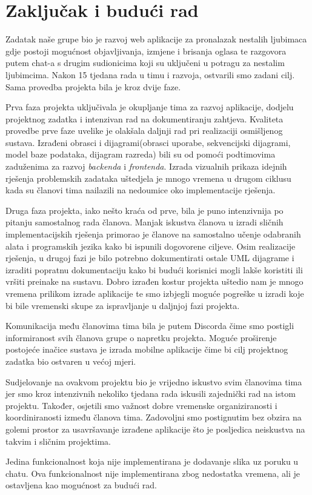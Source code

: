 \chapter{Zaključak i budući rad}

Zadatak naše grupe bio je razvoj web aplikacije za pronalazak nestalih ljubimaca gdje postoji mogućnost objavljivanja, izmjene i brisanja oglasa te razgovora putem chat-a s drugim sudionicima koji su uključeni u potragu za nestalim ljubimcima. Nakon 15 tjedana rada u timu i razvoja, ostvarili smo zadani cilj. Sama provedba projekta bila je kroz dvije faze.

Prva faza projekta uključivala je okupljanje tima za razvoj aplikacije, dodjelu projektnog zadatka i intenzivan rad na dokumentiranju zahtjeva. Kvaliteta provedbe prve faze uvelike je olakšala daljnji rad pri realizaciji osmišljenog sustava. Izrađeni obrasci i dijagrami(obrasci uporabe, sekvencijski dijagrami, model baze podataka, dijagram razreda) bili su od pomoći podtimovima zaduženima za razvoj \textit{backenda} i \textit{frontenda}. Izrada vizualnih prikaza idejnih rješenja problemskih zadataka uštedjela je mnogo vremena u drugom ciklusu kada su članovi tima nailazili na nedoumice oko implementacije rješenja.

Druga faza projekta, iako nešto kraća od prve, bila je puno intenzivnija po pitanju samostalnog rada članova. Manjak iskustva članova u izradi sličnih implementacijskih rješenja primorao je članove na samostalno učenje odabranih alata i programskih jezika kako bi ispunili dogovorene ciljeve. Osim realizacije rješenja, u drugoj fazi je bilo potrebno dokumentirati ostale UML dijagrame i izraditi popratnu dokumentaciju kako bi budući korisnici mogli lakše koristiti ili vršiti preinake na sustavu. Dobro izrađen kostur projekta uštedio nam je mnogo vremena prilikom izrade aplikacije te smo izbjegli moguće pogreške u izradi koje bi bile vremenski skupe za ispravljanje u daljnjoj fazi projekta.

Komunikacija među članovima tima bila je putem Discorda čime smo postigli informiranost svih članova grupe o napretku projekta. Moguće proširenje postojeće inačice sustava je izrada mobilne aplikacije čime bi cilj projektnog zadatka bio ostvaren u većoj mjeri.

Sudjelovanje na ovakvom projektu bio je vrijedno iskustvo svim članovima tima jer smo kroz intenzivnih nekoliko tjedana rada iskusili zajednički rad na istom projektu. Također, osjetili smo važnost dobre vremenske organiziranosti i koordiniranosti između članova tima. Zadovoljni smo postignutim bez obzira na golemi prostor za usavršavanje izrađene aplikacije što je posljedica neiskustva na takvim i sličnim projektima.

Jedina funkcionalnost koja nije implementirana je dodavanje slika uz poruku u chatu. Ova funkcionalnost nije implementirana zbog nedostatka vremena, ali je ostavljena kao mogućnost za budući rad.

\eject